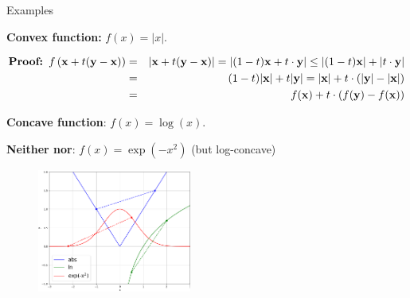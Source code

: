\documentclass[11pt,compress,t,notes=noshow, xcolor=table]{beamer}
\begin{document}
\begin{vbframe}{Examples}

\textbf{Convex function:} $f(x) = |x|$. \\
\begin{footnotesize}

\vspace*{-0.5cm}

\begin{eqnarray*}
\textbf{Proof: } f\left(\mathbf{x} + t(\mathbf{y} - \mathbf{x})\right) &=& |\mathbf{x} + t(\mathbf{y} - \mathbf{x})| = |(1 - t) \mathbf{x} + t\cdot\mathbf{y}| \le |(1 - t) \mathbf{x}| + |t\cdot\mathbf{y}| \\ &=& (1 - t) |\mathbf{x}| + t |\mathbf{y}| = |\mathbf{x}| + t \cdot (|\mathbf{y}| - |\mathbf{x}|) \\ &=& f(\mathbf{x}) + t \cdot (f(\mathbf{y}) - f(\mathbf{x}))
\end{eqnarray*}
\end{footnotesize}

\textbf{Concave function}: $f(x) = \log(x)$. 

\vspace*{0.2cm}

\textbf{Neither nor}: $f(x) = \exp(-x^2)$ (but log-concave)

\begin{figure}
    \centering
    \includegraphics[width=0.45\textwidth]{figure_man/conv_conc_functions.png}
\end{figure}

\end{vbframe}
\end{document}
